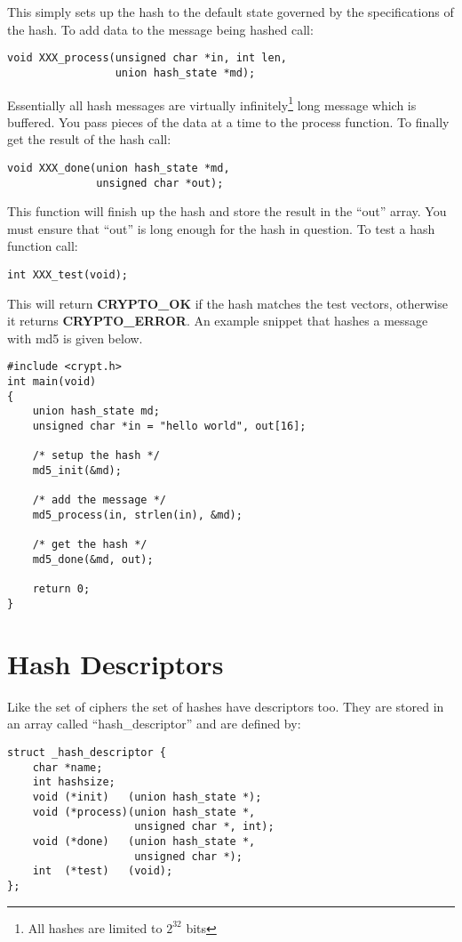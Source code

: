 \documentclass{book}
\begin{document}
This simply sets up the hash to the default state governed by the specifications of the hash.  To add data to the 
message being hashed call:
\begin{verbatim}
void XXX_process(unsigned char *in, int len, 
                 union hash_state *md);
\end{verbatim}

Essentially all hash messages are virtually infinitely\footnote{All hashes are limited to $2^{32}$ bits} long message which is 
buffered.  You pass pieces of the data at a time to the process function.  To finally get the result of the hash
call:
\begin{verbatim}
void XXX_done(union hash_state *md, 
              unsigned char *out);
\end{verbatim}

This function will finish up the hash and store the result in the ``out'' array.  You must ensure that ``out'' is long
enough for the hash in question.  To test a hash function call:
\begin{verbatim}
int XXX_test(void);
\end{verbatim}

This will return {\bf CRYPTO\_OK} if the hash matches the test vectors, otherwise it returns {\bf CRYPTO\_ERROR}.  An
example snippet that hashes a message with md5 is given below.
\begin{verbatim}
#include <crypt.h>
int main(void)
{
    union hash_state md;
    unsigned char *in = "hello world", out[16];

    /* setup the hash */
    md5_init(&md);

    /* add the message */
    md5_process(in, strlen(in), &md);

    /* get the hash */
    md5_done(&md, out);

    return 0;
}
\end{verbatim}

\section{Hash Descriptors}

Like the set of ciphers the set of hashes have descriptors too.  They are stored in an array called ``hash\_descriptor'' and
are defined by:
\begin{verbatim}
struct _hash_descriptor {
    char *name;
    int hashsize;
    void (*init)   (union hash_state *);
    void (*process)(union hash_state *, 
                    unsigned char *, int);
    void (*done)   (union hash_state *, 
                    unsigned char *);
    int  (*test)   (void);
};
\end{verbatim}
\end{document}
